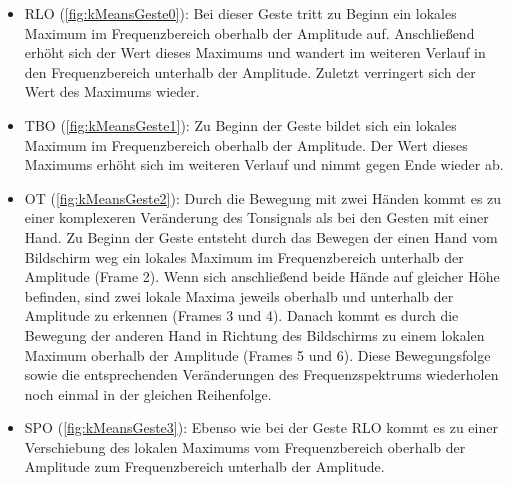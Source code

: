 \begin{itemize}
\item \ac{RLO} (\autoref{fig:kMeansGeste0}): Bei dieser Geste tritt zu Beginn ein lokales Maximum im Frequenzbereich oberhalb der Amplitude auf. Anschließend erhöht sich der Wert dieses Maximums und wandert im weiteren Verlauf in den Frequenzbereich unterhalb der Amplitude. Zuletzt verringert sich der Wert des Maximums wieder.

\item \ac{TBO} (\autoref{fig:kMeansGeste1}): Zu Beginn der Geste bildet sich ein lokales Maximum im Frequenzbereich oberhalb der Amplitude. Der Wert dieses Maximums erhöht sich im weiteren Verlauf und nimmt gegen Ende wieder ab.

\item \ac{OT} (\autoref{fig:kMeansGeste2}): Durch die Bewegung mit zwei Händen kommt es zu einer komplexeren Veränderung des Tonsignals als bei den Gesten mit einer Hand. Zu Beginn der Geste entsteht durch das Bewegen der einen Hand vom Bildschirm weg ein lokales Maximum im Frequenzbereich unterhalb der Amplitude (Frame 2). Wenn sich anschließend beide Hände auf gleicher Höhe befinden, sind zwei lokale Maxima jeweils oberhalb und unterhalb der Amplitude zu erkennen (Frames 3 und 4). 
Danach kommt es durch die Bewegung der anderen Hand in Richtung des Bildschirms zu einem lokalen Maximum oberhalb der Amplitude (Frames 5 und 6).
Diese Bewegungsfolge sowie die entsprechenden Veränderungen des Frequenzspektrums wiederholen noch einmal in der gleichen Reihenfolge.

\item \ac{SPO} (\autoref{fig:kMeansGeste3}): Ebenso wie bei der Geste \ac{RLO} kommt es zu einer Verschiebung des lokalen Maximums vom Frequenzbereich oberhalb der Amplitude zum Frequenzbereich unterhalb der Amplitude.


\end{itemize}
